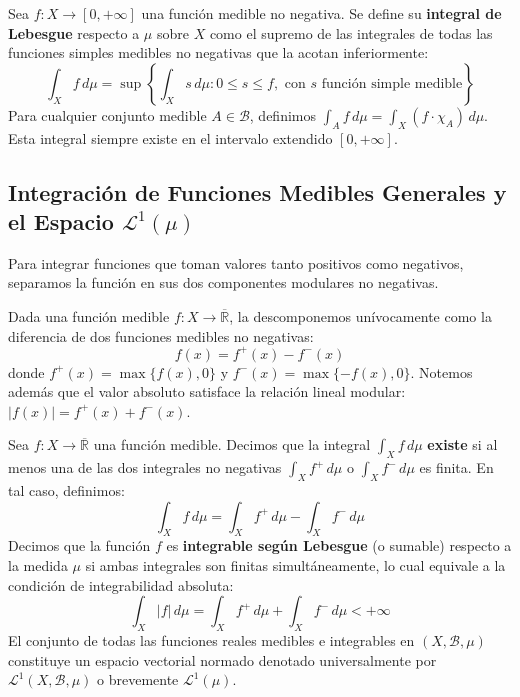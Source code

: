 \begin{definicion}
	Sea $f: X \to [0, +\infty]$ una función medible no negativa. Se define su \textbf{integral de Lebesgue} respecto a $\mu$ sobre $X$ como el supremo de las integrales de todas las funciones simples medibles no negativas que la acotan inferiormente:
	$$ \int_X f \, d\mu = \sup \left\{ \int_X s \, d\mu : 0 \le s \le f, \text{ con } s \text{ función simple medible} \right\} $$
	Para cualquier conjunto medible $A \in \mathcal{B}$, definimos $\int_A f \, d\mu = \int_X (f \cdot \chi_A) \, d\mu$. Esta integral siempre existe en el intervalo extendido $[0, +\infty]$.
\end{definicion}

\subsection{Integración de Funciones Medibles Generales y el Espacio \texorpdfstring{$\mathcal{L}^1(\mu)$}{L\^1(mu)}}

Para integrar funciones que toman valores tanto positivos como negativos, separamos la función en sus dos componentes modulares no negativas.

\begin{definicion}
	Dada una función medible $f: X \to \overline{\mathbb{R}}$, la descomponemos unívocamente como la diferencia de dos funciones medibles no negativas:
	$$ f(x) = f^+(x) - f^-(x) $$
	donde $f^+(x) = \max\{f(x), 0\}$ y $f^-(x) = \max\{-f(x), 0\}$. Notemos además que el valor absoluto satisface la relación lineal modular: $|f(x)| = f^+(x) + f^-(x)$.
\end{definicion}

\begin{definicion}
	Sea $f: X \to \overline{\mathbb{R}}$ una función medible. Decimos que la integral $\int_X f \, d\mu$ \textbf{existe} si al menos una de las dos integrales no negativas $\int_X f^+ \, d\mu$ o $\int_X f^- \, d\mu$ es finita. En tal caso, definimos:
	$$ \int_X f \, d\mu = \int_X f^+ \, d\mu - \int_X f^- \, d\mu $$
	Decimos que la función $f$ es \textbf{integrable según Lebesgue} (o sumable) respecto a la medida $\mu$ si ambas integrales son finitas simultáneamente, lo cual equivale a la condición de integrabilidad absoluta:
	$$ \int_X |f| \, d\mu = \int_X f^+ \, d\mu + \int_X f^- \, d\mu < +\infty $$
	El conjunto de todas las funciones reales medibles e integrables en $(X, \mathcal{B}, \mu)$ constituye un espacio vectorial normado denotado universalmente por $\mathcal{L}^1(X, \mathcal{B}, \mu)$ o brevemente $\mathcal{L}^1(\mu)$.
\end{definicion}

